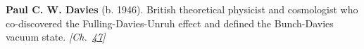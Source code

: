 \textbf{Paul C. W. Davies} (b. 1946). British theoretical physicist and cosmologist who co-discovered the Fulling-Davies-Unruh effect and defined the Bunch-Davies vacuum state. \emph{[Ch.~\hyperref[ch:observervac]{47}]}

